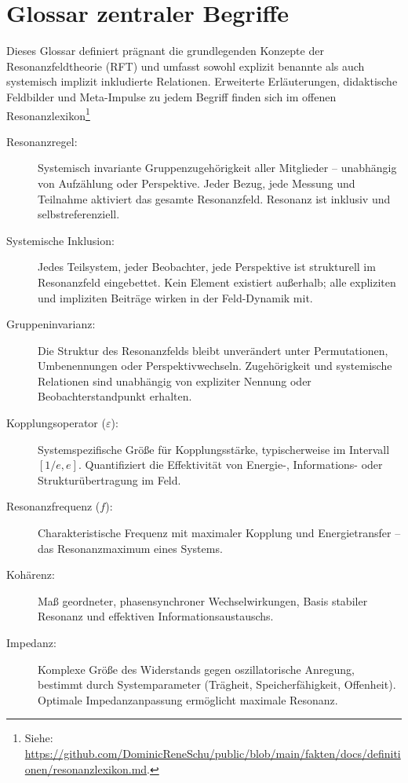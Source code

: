 \documentclass[12pt]{iopart}
\begin{document}
	
\section*{Glossar zentraler Begriffe}

Dieses Glossar definiert prägnant die grundlegenden Konzepte der Resonanzfeldtheorie (RFT) und umfasst sowohl explizit benannte als auch systemisch implizit inkludierte Relationen. Erweiterte Erläuterungen, didaktische Feldbilder und Meta-Impulse zu jedem Begriff finden sich im offenen Resonanzlexikon\footnote{Siehe: \url{https://github.com/DominicReneSchu/public/blob/main/fakten/docs/definitionen/resonanzlexikon.md}.}

\begin{description}
	\item[Resonanzregel:]  
	Systemisch invariante Gruppenzugehörigkeit aller Mitglieder – unabhängig von Aufzählung oder Perspektive. Jeder Bezug, jede Messung und Teilnahme aktiviert das gesamte Resonanzfeld. Resonanz ist inklusiv und selbstreferenziell.
	
	\item[Systemische Inklusion:]  
	Jedes Teilsystem, jeder Beobachter, jede Perspektive ist strukturell im Resonanzfeld eingebettet. Kein Element existiert außerhalb; alle expliziten und impliziten Beiträge wirken in der Feld-Dynamik mit.
	
	\item[Gruppeninvarianz:]  
	Die Struktur des Resonanzfelds bleibt unverändert unter Permutationen, Umbenennungen oder Perspektivwechseln. Zugehörigkeit und systemische Relationen sind unabhängig von expliziter Nennung oder Beobachterstandpunkt erhalten.
	
	\item[Kopplungsoperator ($\varepsilon$):]  
	Systemspezifische Größe für Kopplungsstärke, typischerweise im Intervall $[1/e, e]$. Quantifiziert die Effektivität von Energie-, Informations- oder Strukturübertragung im Feld.
	
	\item[Resonanzfrequenz ($f$):]  
	Charakteristische Frequenz mit maximaler Kopplung und Energietransfer – das Resonanzmaximum eines Systems.
	
	\item[Kohärenz:]  
	Maß geordneter, phasensynchroner Wechselwirkungen, Basis stabiler Resonanz und effektiven Informationsaustauschs.
	
	\item[Impedanz:]  
	Komplexe Größe des Widerstands gegen oszillatorische Anregung, bestimmt durch Systemparameter (Trägheit, Speicherfähigkeit, Offenheit). Optimale Impedanzanpassung ermöglicht maximale Resonanz.
	

\end{description}
\end{document}
